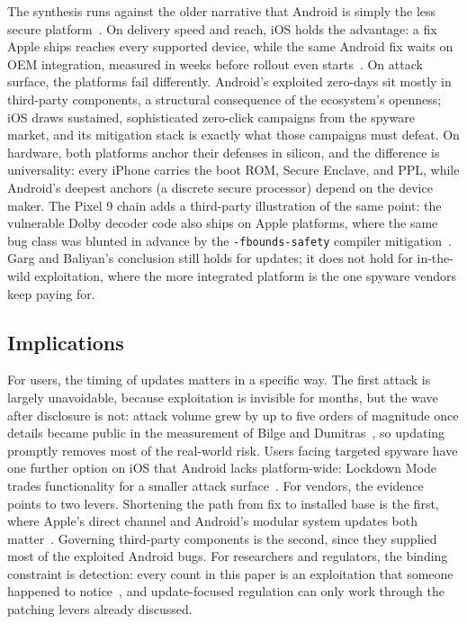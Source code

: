 \documentclass[conference,a4paper]{IEEEtran}
\begin{document}
The synthesis runs against the older narrative that Android is simply the
less secure platform~\cite{garg2021comparative}. On delivery speed and
reach, iOS holds the advantage: a fix Apple ships reaches every supported
device, while the same Android fix waits on OEM integration, measured in
weeks before rollout even starts~\cite{jones2020deploying}. On attack
surface, the platforms fail differently. Android's exploited zero-days sit
mostly in third-party components, a structural consequence of the
ecosystem's openness; iOS draws sustained, sophisticated zero-click
campaigns from the spyware market, and its mitigation stack is exactly
what those campaigns must defeat. On hardware, both platforms anchor
their defenses in silicon, and the difference is universality: every
iPhone carries the boot ROM, Secure Enclave, and PPL, while Android's
deepest anchors (a discrete secure processor) depend on the device
maker. The Pixel 9 chain adds a third-party illustration of the same
point: the vulnerable Dolby decoder code also ships on Apple platforms,
where the same bug class was blunted in advance by the
\texttt{-fbounds-safety} compiler mitigation~\cite{silvanovich2026pixel}.
Garg and Baliyan's conclusion still holds for updates; it does not
hold for in-the-wild exploitation, where the more integrated platform is
the one spyware vendors keep paying for.

\subsection{Implications}
For users, the timing of updates matters in a specific way. The first
attack is largely unavoidable, because exploitation is invisible for
months, but the wave after disclosure is not: attack volume grew by up to
five orders of magnitude once details became public in the measurement of
Bilge and Dumitras~\cite{bilge2012before}, so updating promptly removes
most of the real-world risk. Users facing targeted spyware have one
further option on iOS that Android lacks platform-wide: Lockdown Mode
trades functionality for a smaller attack surface~\cite{lockdown2022}.
For vendors, the evidence points to two levers. Shortening the path from
fix to installed base is the first, where Apple's direct channel and
Android's modular system updates both matter~\cite{applersr2026,
mainline2019}. Governing third-party components is the second, since they
supplied most of the exploited Android bugs. For researchers and
regulators, the binding constraint is detection: every count in this
paper is an exploitation that someone happened to
notice~\cite{p0tracker}, and update-focused regulation can only work
through the patching levers already discussed.
\end{document}
